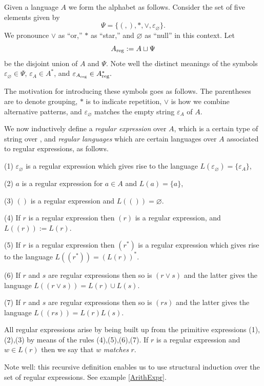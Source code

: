 \begin{defn}\label{regexdef} Given a language $A$ we form the alphabet
    \Areg{} as follows.  Consider the set of five elements given by
    $$\Psi = \{(,), *, \vee, \varepsilon_\varnothing\}.$$   We
    pronounce $\vee$ as ``or,'' $*$ as ``star,'' and $\varnothing$ as
    ``null'' in this context. Let \[A_{\text{reg}} := A \sqcup \Psi \] be the
    disjoint union of $A$ and $\Psi.$ Note well the distinct meanings
    of the symbols $\varepsilon_\varnothing\in \Psi$,
    $\varepsilon_A\in A^*$, and $\varepsilon_{A_{\text{reg}}} \in A_{\text{reg}}^*.$

    The motivation for introducing these symbols goes as follows. The
    parentheses are to denote grouping, $*$ is to indicate repetition,
    $\vee$ is how we combine alternative patterns, and
    $\varepsilon_\varnothing$ matches the empty string $\varepsilon_A$
    of $A$.

    We now inductively define a \emph{regular expression} over $A$,
    which is a certain type of string over \Areg, and \emph{regular
    languages} which are certain languages over $A$ associated to
    regular expressions, as follows.

    (1) $\varepsilon_\varnothing$ is a regular expression
    which gives rise to the language $L(\varepsilon_\varnothing) =
    \{\varepsilon_A\}$,

    (2) $a$ is a regular expression for $a\in A$ and $L(a) = \{a\}$,

    (3) $()$ is a regular expression and $L( ( ) ) = \varnothing$.

    (4) If $r$ is a regular expression then $(r)$ is a regular
    expression, and $L( ( r) ) := L(r)$.

    (5) If $r$ is a regular expression then $(r^*)$ is a regular
    expression which gives rise to the language $L( (r^*) ) =
    (L(r))^*.$

    (6) If $r$ and $s$ are regular expressions then so is $(r\vee s)$
    and the latter gives the language $L( (r \vee s) ) = L(r)\cup L(s)$.

    (7) If $r$ and $s$ are regular expressions then so is $(r s)$
    and the latter gives the language $L( (r s) ) = L(r)L(s)$.

    All regular expressions arise by being built up from the primitive
    expressions (1),(2),(3) by means of the rules (4),(5),(6),(7). If $r$
    is a regular expression and $w\in L(r)$ then we say that $w$
    \emph{matches} $r$.

    Note well: this recursive definition enables us to use structural
    induction over the set of regular expressions. See example
    \ref{ArithExpr}.
\end{defn}

